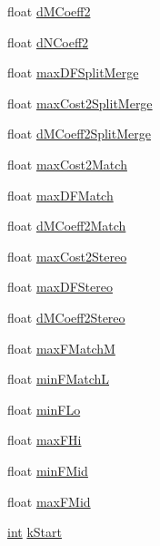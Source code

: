 \begin{DoxyCompactItemize}
\item 
float \hyperlink{class__sbsms___1_1_s_m_s_a352aeafbe990c087aca31c96ca9ce6f4}{d\+M\+Coeff2}
\item 
float \hyperlink{class__sbsms___1_1_s_m_s_a4689a6dba721b47b94e74bb01b54a737}{d\+N\+Coeff2}
\item 
float \hyperlink{class__sbsms___1_1_s_m_s_a54d21724cb856d088fdcb7caf0c2ef55}{max\+D\+F\+Split\+Merge}
\item 
float \hyperlink{class__sbsms___1_1_s_m_s_ac458eca77788aae016121f49e78efdd1}{max\+Cost2\+Split\+Merge}
\item 
float \hyperlink{class__sbsms___1_1_s_m_s_a9054a322405cdc75aaa88f72a63b7f45}{d\+M\+Coeff2\+Split\+Merge}
\item 
float \hyperlink{class__sbsms___1_1_s_m_s_a9ad21e543ef2a0cbb16042c44ba711ce}{max\+Cost2\+Match}
\item 
float \hyperlink{class__sbsms___1_1_s_m_s_ad725d2bc2b7e676030cd0f7d303e0643}{max\+D\+F\+Match}
\item 
float \hyperlink{class__sbsms___1_1_s_m_s_a7b19101b415ae8c527fd398356a6d6c3}{d\+M\+Coeff2\+Match}
\item 
float \hyperlink{class__sbsms___1_1_s_m_s_a47e7cafcabf3f86df492c51f20aad325}{max\+Cost2\+Stereo}
\item 
float \hyperlink{class__sbsms___1_1_s_m_s_a9c1deda84ae4500c846dc6887f0da817}{max\+D\+F\+Stereo}
\item 
float \hyperlink{class__sbsms___1_1_s_m_s_a76ac3e153905f281113328b1da1f8f89}{d\+M\+Coeff2\+Stereo}
\item 
float \hyperlink{class__sbsms___1_1_s_m_s_af416f187a9c0f700a3bab36f9fd9f0c7}{max\+F\+MatchM}
\item 
float \hyperlink{class__sbsms___1_1_s_m_s_ae2acc271c35b11122eeeb6bdb45566dd}{min\+F\+MatchL}
\item 
float \hyperlink{class__sbsms___1_1_s_m_s_ade0f6e4f5be49360f77266553fed30c6}{min\+F\+Lo}
\item 
float \hyperlink{class__sbsms___1_1_s_m_s_a62e9972f9196d890e6658d60779d18c6}{max\+F\+Hi}
\item 
float \hyperlink{class__sbsms___1_1_s_m_s_ae372780cfb230946c28e034fc2c0e0cd}{min\+F\+Mid}
\item 
float \hyperlink{class__sbsms___1_1_s_m_s_a4945f83fd0b778c3fd7012e83c405b59}{max\+F\+Mid}
\item 
\hyperlink{xmltok_8h_a5a0d4a5641ce434f1d23533f2b2e6653}{int} \hyperlink{class__sbsms___1_1_s_m_s_acd65f383388dd63abe5db92b159adac8}{k\+Start}

\end{DoxyCompactItemize}
